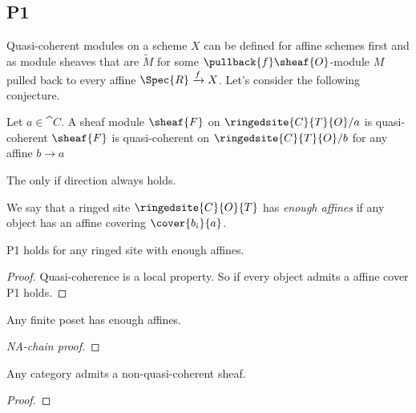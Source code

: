 \subsection{P1}

Quasi-coherent modules on a scheme $X$ can be defined for affine schemes first and  as module sheaves that are $\tilde{M}$ for some $\pullback{f}\sheaf{O}$-module $M$ pulled back to every affine $\Spec{R}\xrightarrow{f} X$. 
Let's consider the following conjecture. 

\begin{conjecture}[P1]
Let $a\in \cat{C}$.
A sheaf module $\sheaf{F}$ on $\ringedsite{C}{T}{O}/a$ is quasi-coherent \iff $\sheaf{F}$ is quasi-coherent on $\ringedsite{C}{T}{O}/b$ for any affine $b\rightarrow a$
\end{conjecture}

\begin{remark}
The only if direction always holds.
\end{remark}

\begin{definition}
We say that a ringed site $\ringedsite{C}{O}{T}$ has \emph{enough affines} if any object has an affine covering $\cover{b_i}{a}$.
\end{definition}

\begin{lemma}
P1 holds for any ringed site with enough affines.
\end{lemma}

\begin{proof}
Quasi-coherence is a local property. So if every object admits a affine cover P1 holds.
\end{proof}

\begin{lemma}
Any finite poset has enough affines.
\end{lemma}

\begin{proof}[NA-chain proof]

\end{proof}

\begin{lemma}
Any category admits a non-quasi-coherent sheaf.
\end{lemma}

\begin{proof}

\end{proof}

